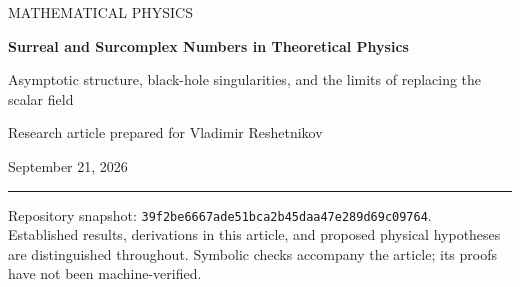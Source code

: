\documentclass[11pt,a4paper]{article}
\numberwithin{equation}{section}
\theoremstyle{definition}
\theoremstyle{remark}
\begin{document}
\begin{titlepage}
\setlength{\parindent}{0pt}
\vspace*{17mm}
{\Large\color{ink} MATHEMATICAL PHYSICS\par}
\vspace{10mm}
{\Huge\bfseries Surreal and Surcomplex Numbers in Theoretical Physics\par}
\vspace{7mm}
{\LARGE Asymptotic structure, black-hole singularities, and the limits of replacing the scalar field\par}
\vspace{13mm}
{\large Research article prepared for Vladimir Reshetnikov\par}
\vspace{3mm}
{\large September 21, 2026\par}
\vspace{12mm}
\noindent\rule{\textwidth}{0.5pt}
\begin{abstract}
Surreal numbers provide exact arithmetic for an exceptionally rich hierarchy of infinite and infinitesimal scales. Their complexification supports much of finite-dimensional complex algebra. These facts make them plausible tools for asymptotic mathematical physics, but do not by themselves make spacetime singularities regular. We distinguish scalar extension of algebraic formulas, coefficientwise non-Archimedean field theories on ordinary spacetime, and a genuinely surreal-valued spacetime theory. A detailed Schwarzschild calculation shows that replacing a small radius by a nonzero infinitesimal preserves, rather than removes, invariant curvature blow-up and destructive tidal behavior. We prove a conditional standard-part reduction theorem for Einstein's equation, identify the topological obstacles to a literal replacement of real time, and establish a finite-dimensional quantum-mechanical reduction result. Constructive applications include valuation-controlled perturbation theory, multiscale singularity diagnostics, and transseries bookkeeping, subject to support, realization, and measurement requirements. A regular-core comparison separates new dynamics from new notation. The article concludes with a concrete development and verification program for the supplied repository. This is a mathematical assessment and research proposal, not a claim to have obtained a quantum-gravity resolution of black-hole singularities.
\end{abstract}
\vfill
\noindent\small Repository snapshot: \texttt{39f2be6667ade51bca2b45daa47e289d69c09764}.\\
Established results, derivations in this article, and proposed physical hypotheses are distinguished throughout. Symbolic checks accompany the article; its proofs have not been machine-verified.
\end{titlepage}
\tableofcontents
\clearpage
\end{document}
